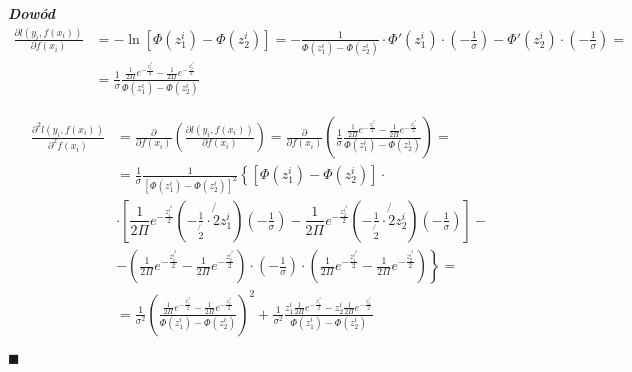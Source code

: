 \documentclass[12pt,a4paper]{article}
\newenvironment{dow}{\textbf{\textit{Dowód}}}{\begin{flushright} $\blacksquare$ \end{flushright}}
\begin{document}
\begin{dow}
\begin{align*}
\frac{\partial\textit{l}(y_i, f(x_i))}{\partial f(x_i)} 
&= -\ln\left[\Phi\left( z_1^i \right) - \Phi\left( z_2^i \right)\right] = -\frac{1}{\Phi\left( z_1^i \right) - \Phi\left( z_2^i \right)}\cdot \Phi'\left( z_1^i \right)\cdot \left( -\frac{1}{\sigma} \right) - \Phi'\left( z_2^i \right)\cdot \left( -\frac{1}{\sigma} \right) = \\
&= \frac{1}{\sigma}\frac{\frac{1}{2\Pi}e^{-\frac{z_1^{i^2}}{2}}-\frac{1}{2\Pi}e^{-\frac{z_2^{i^2}}{2}}}{\Phi\left( z_1^i \right) - \Phi\left( z_2^i \right)}
\end{align*}

\begin{align*}
\frac{\partial^2\textit{l}(y_i, f(x_i))}{\partial^2 f(x_i)} 
&= \frac{\partial}{\partial f(x_i)}\left( \frac{\partial\textit{l}(y_i, f(x_i))}{\partial f(x_i)} \right) = \frac{\partial}{\partial f(x_i)}\left( \frac{1}{\sigma}\frac{\frac{1}{2\Pi}e^{-\frac{z_1^{i^2}}{2}}-\frac{1}{2\Pi}e^{-\frac{z_2^{i^2}}{2}}}{\Phi\left( z_1^i \right) - \Phi\left( z_2^i \right)} \right) =\\
&= \frac{1}{\sigma}\frac{1}{\left[\Phi\left( z_1^i \right) - \Phi\left( z_2^i \right)\right]^2} \left\lbrace    \left[\Phi\left( z_1^i \right) - \Phi\left( z_2^i \right)\right]\cdot\right.\\
&\cdot \left[ 
\dfrac{1}{2\Pi}e^{-\frac{z_1^{i^2}}{2}}\left(-\frac{1}{\not{2}}\cdot \not{2}z_1^i\right)\left(-\frac{1}{\sigma} \right) -     
 \dfrac{1}{2\Pi}e^{-\frac{z_2^{i^2}}{2}}\left(-\frac{1}{\not{2}}\cdot \not{2}z_2^i\right)\left(-\frac{1}{\sigma} \right) \right] -\\
&- 
\left. 
\left( 
\frac{1}{2\Pi}
e^{-\frac{z_1^{i^2}}{2}}
-
\frac{1}{2\Pi}
e^{-\frac{z_2^{i^2}}{2}} 
\right)
\cdot
\left(
-\frac{1}{\sigma} 
\right) 
\cdot 
\left( 
\frac{1}{2\Pi}e^{-\frac{z_1^{i^2}}{2}}-\frac{1}{2\Pi}e^{-\frac{z_2^{i^2}}{2}} 
\right)
\right\rbrace =\\
&=\frac{1}{\sigma^2}\left( \frac{\frac{1}{2\Pi}e^{-\frac{z_1^{i^2}}{2}}-\frac{1}{2\Pi}e^{-\frac{z_2^{i^2}}{2}}}{\Phi\left( z_1^i \right) - \Phi\left( z_2^i \right)} \right)^2 + \frac{1}{\sigma^2}\frac{z_1^i\frac{1}{2\Pi}e^{-\frac{z_1^{i^2}}{2}}-z_2^i\frac{1}{2\Pi}e^{-\frac{z_2^{i^2}}{2}}}{\Phi\left( z_1^i \right) - \Phi\left( z_2^i \right)}
\end{align*}

\end{dow}
\end{document}
